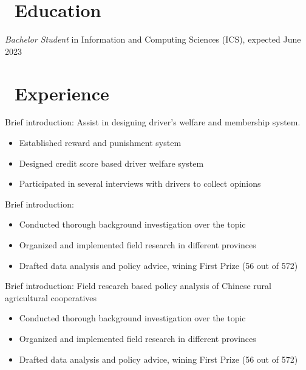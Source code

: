 \documentclass{resume}
\begin{document}



\section{\faGraduationCap\ Education}
\textit{Bachelor Student} in Information and Computing Sciences (ICS), expected June 2023


\section{\faUsers\ Experience}
Brief introduction: Assist in designing driver's welfare and membership system.
\begin{itemize}
  \item Established reward and punishment system 
  \item Designed credit score based driver welfare system 
  \item Participated in several interviews with drivers to collect opinions 
\end{itemize}
Brief introduction: 
\begin{itemize}
  \item Conducted thorough background investigation over the topic
  \item Organized and implemented field research in different provinces
  \item Drafted data analysis and policy advice, wining First Prize (56 out of 572) 
\end{itemize}
Brief introduction: Field research based policy analysis of Chinese 
rural agricultural cooperatives 
\begin{itemize}
  \item Conducted thorough background investigation over the topic
  \item Organized and implemented field research in different provinces
  \item Drafted data analysis and policy advice, wining First Prize (56 out of 572) 
\end{itemize}
\end{document}
